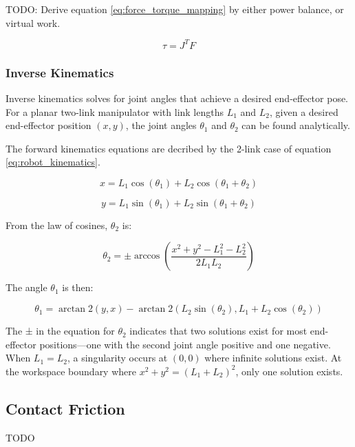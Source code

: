     TODO: Derive equation \ref{eq:force_torque_mapping} by either power balance, or virtual work. 

    \begin{equation}
        \label{eq:force_torque_mapping}
        \tau = J^T F
    \end{equation}

    \subsubsection{Inverse Kinematics}
    Inverse kinematics solves for joint angles that achieve a desired end-effector pose. For a planar two-link manipulator with link lengths \(L_1\) and \(L_2\), given a desired end-effector position \((x,y)\), the joint angles \(\theta_1\) and \(\theta_2\) can be found analytically.

    The forward kinematics equations are decribed by the 2-link case of equation \ref{eq:robot_kinematics}.
    
    \begin{equation}
    x = L_1 \cos(\theta_1) + L_2 \cos(\theta_1 + \theta_2)
    \end{equation}
    
    \begin{equation}
    y = L_1 \sin(\theta_1) + L_2 \sin(\theta_1 + \theta_2)
    \end{equation}
    
    From the law of cosines, \(\theta_2\) is:
    
    \begin{equation}
    \theta_2 = \pm \arccos\left(\frac{x^2 + y^2 - L_1^2 - L_2^2}{2L_1L_2}\right)
    \end{equation}
    
    The angle \(\theta_1\) is then:
    
    \begin{equation}
    \theta_1 = \arctan2(y,x) - \arctan2(L_2\sin(\theta_2), L_1 + L_2\cos(\theta_2))
    \end{equation}
    
    The ± in the equation for \(\theta_2\) indicates that two solutions exist for most end-effector positions—one with the second joint angle positive and one negative. When \(L_1 = L_2\), a singularity occurs at \((0,0)\) where infinite solutions exist. At the workspace boundary where \(x^2 + y^2 = (L_1 + L_2)^2\), only one solution exists.


\subsection{Contact Friction}
\label{sec:contact_friction}
TODO

